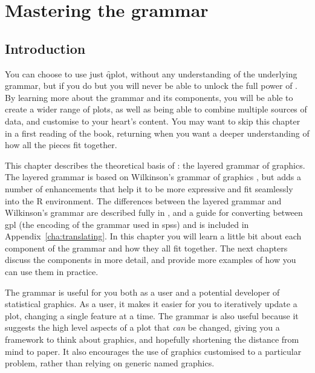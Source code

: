 

% 


\chapter{Mastering the grammar}
\label{cha:mastery}

\section{Introduction}

You can choose to use just \f{qplot}, without any understanding of the underlying grammar, but if you do but you will never be able to unlock the full power of \ggplot.  By learning more about the grammar and its components, you will be able to create a wider range of plots, as well as being able to combine multiple sources of data, and customise to your heart's content.  You may want to skip this chapter in a first reading of the book, returning when you want a deeper understanding of how all the pieces fit together.

This chapter describes the theoretical basis of \ggplot: the layered grammar of graphics.  The layered grammar is based on Wilkinson's grammar of graphics \citep{wilkinson:2006}, but adds a number of enhancements that help it to be more expressive and fit seamlessly into the R environment.  The differences between the layered grammar and Wilkinson's grammar are described fully in \citep{wickham:2008}, and a guide for converting between {\sc gpl} (the encoding of the grammar used in {\sc spss}) and \ggplot is included in Appendix~\ref{cha:translating}.  In this chapter you will learn a little bit about each component of the grammar and how they all fit together.  The next chapters discuss the components in more detail, and provide more examples of how you can use them in practice.

The grammar is useful for you both as a user and a potential developer of statistical graphics.  As a user, it makes it easier for you to iteratively update a plot, changing a single feature at a time.  The grammar is also useful because it suggests the high level aspects of a plot that \emph{can} be changed, giving you a framework to think about graphics, and hopefully shortening the distance from mind to paper.  It also encourages the use of graphics customised to a particular problem, rather than relying on generic named graphics.

